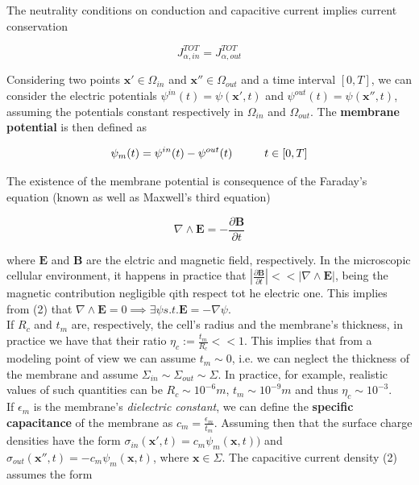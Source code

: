 \documentclass[a4paper]{article}
\begin{document}
The neutrality conditions on conduction and capacitive current implies current conservation 

	\begin{equation}
	J_{\alpha,in}^{TOT} = J_{\alpha,out}^{TOT}
	\end{equation}
	
Considering two points $ \textbf{x}' \in \Omega_{in}$ and $ \textbf{x}'' \in \Omega_{out}$ and a time interval $ [0,T]$, we can consider the electric potentials $ \psi^{in} (t) = \psi(\textbf{x}',t) $ and  $ \psi^{out} (t) = \psi(\textbf{x}'',t) $, assuming the potentials constant respectively in $\Omega_{in}$ and $\Omega_{out}$. The \textbf{membrane potential} is then defined as

\begin{equation}
	\psi_m (t) = \psi^{in} (t) -  \psi^{out} (t) \hspace{1 cm}  t \in [0,T]
\end{equation}
	
	
	The existence of the membrane potential is consequence of the Faraday's equation (known as well as Maxwell's third equation)
	
	\begin{equation}
		\nabla \wedge \textbf{E} = -\frac{\partial \textbf{B}}{\partial t}
	\end{equation}
	
	where $\textbf{E}$ and $\textbf{B}$ are the elctric and magnetic field, respectively. In the microscopic cellular environment, it happens in practice that $ \left| \frac{\partial \textbf{B}}{\partial t} \right| << \left| \nabla \wedge \textbf{E}\right|$, being the magnetic contribution negligible qith respect tot he electric one. This implies from (2) that $\nabla \wedge \textbf{E} = 0 \implies \exists \psi s.t. \textbf{E} = -\nabla \psi$.\\
If $R_c$ and $t_m$ are, respectively, the cell's radius and the membrane's thickness, in practice we have that their ratio $ \eta_c := \frac{t_m}{R_c} << 1$. This implies that from a modeling point of view we can assume $t_m \sim 0 $, i.e. we can neglect the thickness of the membrane and assume $\Sigma_{in} \sim \Sigma_{out} \sim \Sigma$. In practice, for example, realistic values of such quantities can be $ R_c \sim 10^{-6} m$, $ t_m \sim 10^{-9} m$ and thus $\eta_c \sim 10^{-3}$.\\
If $\epsilon_m$ is the membrane's \textit{dielectric constant}, we can define the \textbf{specific capacitance} of the membrane as $ c_m = \frac{\epsilon_m}{t_m}$. Assuming then that the surface charge densities have the form $\sigma_{in}(\textbf{x}',t) = c_m \psi_m (\textbf{x},t)) $ and  $\sigma_{out}(\textbf{x}'',t) = -c_m \psi_m (\textbf{x},t) $, where $\textbf{x} \in \Sigma$. The capacitive current density (2) assumes the form
\end{document}
